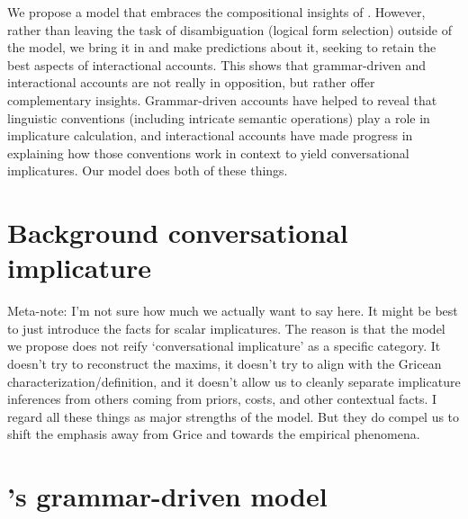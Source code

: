 \documentclass{article}
\begin{document}
\begin{examples}
\item We propose a model that embraces the compositional insights of
  \CFS. However, rather than leaving the task of disambiguation
  (logical form selection) outside of the model, we bring it in and
  make predictions about it, seeking to retain the best aspects of
  interactional accounts. This shows that grammar-driven and
  interactional accounts are not really in opposition, but rather
  offer complementary insights.  Grammar-driven accounts have helped
  to reveal that linguistic conventions (including intricate semantic
  operations) play a role in implicature calculation, and
  interactional accounts have made progress in explaining how those
  conventions work in context to yield conversational implicatures.
  Our model does both of these things.

\end{examples}



\section{Background  conversational implicature}\label{sec:ci}

\begin{examples}
\item Meta-note: I'm not sure how much we actually want to say here.
  It might be best to just introduce the facts for scalar
  implicatures. The reason is that the model we propose does not reify
  `conversational implicature' as a specific category. It doesn't try
  to reconstruct the maxims, it doesn't try to align with the Gricean
  characterization/definition, and it doesn't allow us to cleanly
  separate implicature inferences from others coming from priors,
  costs, and other contextual facts. I regard all these things as
  major strengths of the model. But they do compel us to shift the
  emphasis away from Grice and towards the empirical phenomena.
\end{examples}



\section{\CFS's grammar-driven model}\label{sec:grammar}
\end{document}
